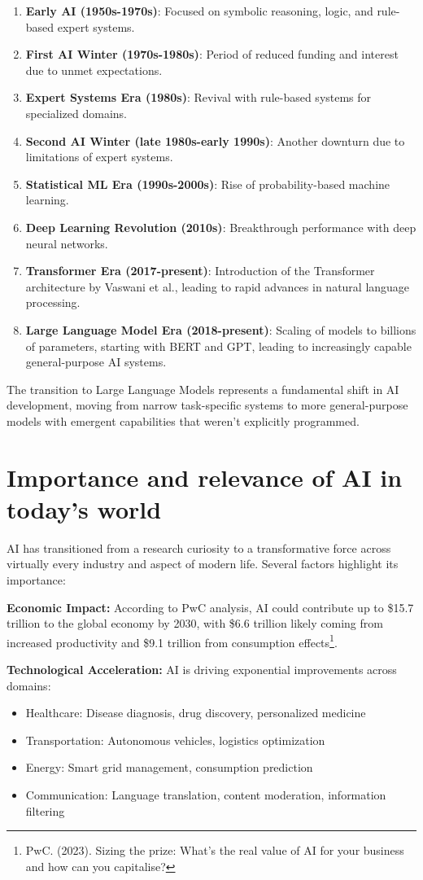 \documentclass[11pt,a4paper]{report}
\begin{document}
\begin{enumerate}
    \item \textbf{Early AI (1950s-1970s)}: Focused on symbolic reasoning, logic, and rule-based expert systems.
    \item \textbf{First AI Winter (1970s-1980s)}: Period of reduced funding and interest due to unmet expectations.
    \item \textbf{Expert Systems Era (1980s)}: Revival with rule-based systems for specialized domains.
    \item \textbf{Second AI Winter (late 1980s-early 1990s)}: Another downturn due to limitations of expert systems.
    \item \textbf{Statistical ML Era (1990s-2000s)}: Rise of probability-based machine learning.
    \item \textbf{Deep Learning Revolution (2010s)}: Breakthrough performance with deep neural networks.
    \item \textbf{Transformer Era (2017-present)}: Introduction of the Transformer architecture by Vaswani et al., leading to rapid advances in natural language processing.
    \item \textbf{Large Language Model Era (2018-present)}: Scaling of models to billions of parameters, starting with BERT and GPT, leading to increasingly capable general-purpose AI systems.
\end{enumerate}

The transition to Large Language Models represents a fundamental shift in AI development, moving from narrow task-specific systems to more general-purpose models with emergent capabilities that weren't explicitly programmed.

\section{Importance and relevance of AI in today's world}
AI has transitioned from a research curiosity to a transformative force across virtually every industry and aspect of modern life. Several factors highlight its importance:

\textbf{Economic Impact:} According to PwC analysis, AI could contribute up to \$15.7 trillion to the global economy by 2030, with \$6.6 trillion likely coming from increased productivity and \$9.1 trillion from consumption effects\footnote{PwC. (2023). Sizing the prize: What's the real value of AI for your business and how can you capitalise?}.

\textbf{Technological Acceleration:} AI is driving exponential improvements across domains:
\begin{itemize}
    \item Healthcare: Disease diagnosis, drug discovery, personalized medicine
    \item Transportation: Autonomous vehicles, logistics optimization
    \item Energy: Smart grid management, consumption prediction
    \item Communication: Language translation, content moderation, information filtering
\end{itemize}
\end{document}

